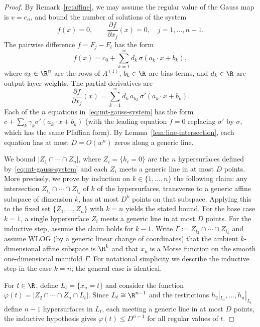 \begin{proof}
By Remark~\ref{re:affine}, we may assume the regular value of the Gauss map is $v=e_n$, and bound the number of solutions of the system
\begin{equation}\label{eq:mt-gauss-system}
  f(x) = 0, \qquad \frac{\partial f}{\partial x_j}(x) = 0, \quad j = 1,\ldots, n-1.
\end{equation}
The pairwise difference $f = F_j - F_i$ has the form
\begin{equation}\label{eq:mt-f}
  f(x) = c_0 + \sum_{k=1}^w d_k\, \sigma(a_k\cdot x + b_k),
\end{equation}
where $a_k\in \R^n$ are the rows of $A^{(1)}$, $b_k\in \R$ are bias terms, and $d_k\in \R$ are output-layer weights. The partial derivatives are
\begin{equation*}
  \frac{\partial f}{\partial x_j}(x) = \sum_{k=1}^w d_k\, a_{kj}\, \sigma'(a_k\cdot x + b_k).
\end{equation*}
Each of the $n$ equations in~\eqref{eq:mt-gauss-system} has the form $c + \sum_k \gamma_k \sigma'(a_k\cdot x + b_k)$ (with the leading equation $f=0$ replacing $\sigma'$ by $\sigma$, which has the same Pfaffian form). By Lemma~\ref{lem:line-intersection}, each equation has at most $D = O(w^n)$ zeros along a generic line.

We bound $|Z_1\cap \cdots \cap Z_n|$, where $Z_i = \{h_i = 0\}$ are the $n$ hypersurfaces defined by~\eqref{eq:mt-gauss-system} and each $Z_i$ meets a generic line in at most $D$ points. More precisely, we prove by induction on $k\in \{1,\ldots,n\}$ the following claim: any intersection $Z_{i_1}\cap \cdots \cap Z_{i_k}$ of $k$ of the hypersurfaces, transverse to a generic affine subspace of dimension $k$, has at most $D^k$ points on that subspace. Applying this to the fixed set $\{Z_1,\ldots,Z_n\}$ with $k=n$ yields the stated bound. For the base case $k = 1$, a single hypersurface $Z_i$ meets a generic line in at most $D$ points. For the inductive step, assume the claim holds for $k-1$. Write $\Gamma := Z_{i_2}\cap \cdots \cap Z_{i_k}$ and assume WLOG (by a generic linear change of coordinates) that the ambient $k$-dimensional affine subspace is $\R^k$ and that $x_k$ is a Morse function on the smooth one-dimensional manifold $\Gamma$. For notational simplicity we describe the inductive step in the case $k=n$; the general case is identical.

For $t\in \R$, define $L_t = \{x_n = t\}$ and consider the function $\varphi(t) = |Z_2\cap \cdots \cap Z_n \cap L_t|$. Since $L_t\cong \R^{n-1}$ and the restrictions $h_2|_{L_t},\ldots,h_n|_{L_t}$ define $n - 1$ hypersurfaces in $L_t$, each meeting a generic line in at most $D$ points, the inductive hypothesis gives $\varphi(t) \leq D^{n-1}$ for all regular values of $t$.


\end{proof}
